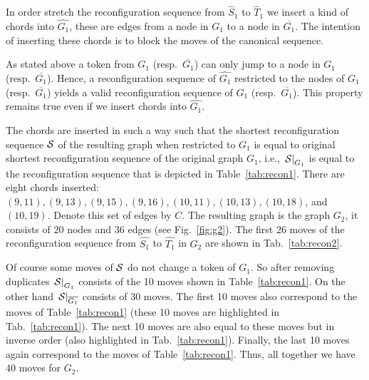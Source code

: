 \documentclass{article}
\begin{document}
In order stretch the reconfiguration sequence from $\hat{S}_1$ to
$\hat{T}_1$ we insert a kind of chords into $\hat{G_1}$, these are
edges from a node in $G_1$ to a node in $\overline{G_1}$. The
intention of inserting these chords is to block the moves of the
canonical sequence.

As stated above a token from $G_1$ (resp.\ $\overline{G_1}$) can only
jump to a node in $G_1$ (resp.\ $\overline{G_1}$). Hence, a
reconfiguration sequence of $\hat{G_1}$ restricted to the nodes of
$G_1$ (resp.\ $\overline{G_1}$) yields a valid reconfiguration
sequence of $G_1$ (resp.\ $\overline{G_1}$). This property remains
true even if we insert chords into $\hat{G_1}$.

The chords are inserted in such a way such that the shortest
reconfiguration sequence $\cal S$ of the resulting graph when
restricted to $G_1$ is equal to original shortest reconfiguration
sequence of the original graph $G_1$, i.e.,
$\left.{\cal S}\right|_{G_1}$ is equal to the reconfiguration sequence
that is depicted in Table~\ref{tab:recon1}. There are eight chords
inserted: $(9,11), (9,13), (9,15), (9,16), (10,11), (10,13), (10,18)$,
and $(10,19)$. Denote this set of edges by $C$. The resulting graph is
the graph $G_2$, it consists of $20$ nodes and $36$ edges (see
Fig.~\ref{fig:g2}). The first 26 moves of the reconfiguration sequence
from $\hat{S_1}$ to $\hat{T_1}$ in $G_2$ are shown in
Tab.~\ref{tab:recon2}.

Of course some moves of $\cal S$ do not change a token of $G_1$. So
after removing duplicates $\left.{\cal S}\right|_{G_1}$ consists of
the 10 moves shown in Table~\ref{tab:recon1}. On the other hand
$\left.{\cal S}\right|_{\overline{G_1}}$ consists of 30 moves. The
first 10 moves also correspond to the moves of Table~\ref{tab:recon1}
(these 10 moves are highlighted in Tab.~\ref{tab:recon1}). The next 10
moves are also equal to these moves but in inverse order (also
highlighted in Tab.~\ref{tab:recon1}). Finally, the last 10 moves
again correspond to the moves of Table~\ref{tab:recon1}. Thus, all
together we have $40$ moves for $G_2$.

\newcommand{\cbox}[1]{\colorbox{lightgray}{\vrule width 0pt height 1.1\ht\strutbox depth .9\dp\strutbox\relax #1}}
\end{document}
